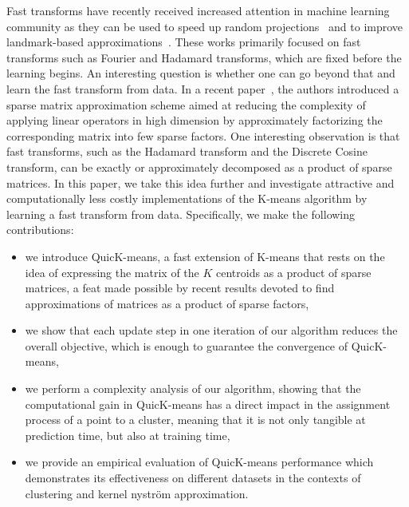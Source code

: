 Fast transforms have recently received increased attention in machine learning community as they can be used  to speed up random projections~\cite{le2013fastfood,gittens2016revisiting} and to improve landmark-based approximations~\cite{si2016computationally}.
%
These works primarily focused on fast transforms such as Fourier and Hadamard transforms, which are fixed before the learning begins. An interesting question is whether one can go beyond that and learn the fast transform from data. 
%
In a recent paper~\cite{LeMagoarou2016Flexible}, the authors introduced a sparse matrix approximation scheme aimed  at  reducing the  complexity  of  applying  linear  operators  in  high  dimension by   approximately   factorizing   the   corresponding   matrix   into few   sparse   factors. One interesting observation is that fast transforms, such as the  Hadamard  transform  and  the  Discrete  Cosine  transform, can be exactly or approximately decomposed as a product of sparse matrices.
%
In this paper, we take this idea further and investigate attractive and computationally less costly implementations of the K-means algorithm by learning a fast transform from data.
%
Specifically, we make the following contributions:
\begin{itemize}
	\item we introduce QuicK-means, a fast extension of K-means that rests on the idea of expressing the matrix of the $K$ centroids as a product of sparse matrices, a feat made possible by recent results devoted to find approximations of matrices as a product of sparse factors,
	\item we show that each update step in one iteration of our algorithm  reduces the overall objective, which is enough to guarantee the convergence of QuicK-means,
	\item we perform a complexity analysis of our algorithm, showing that the computational gain in QuicK-means  has a direct impact in the assignment process of a point to a cluster, meaning that it is not only tangible at prediction time, but also at training time,
	\item we provide an empirical evaluation of QuicK-means  performance which demonstrates its effectiveness on different datasets in the contexts of clustering and kernel nystr\"om approximation.
\end{itemize}





